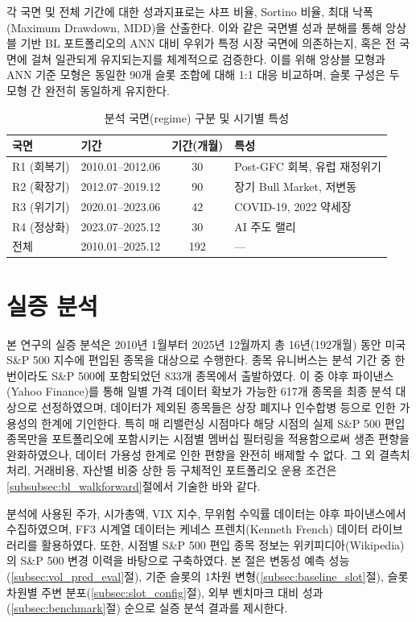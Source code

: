 \documentclass[eng]{kjas3}
\begin{document}
각 국면 및 전체 기간에 대한 성과지표로는 샤프 비율, Sortino 비율, 최대 낙폭(Maximum Drawdown, MDD)을 산출한다. 이와 같은 국면별 성과 분해를 통해 앙상블 기반 BL 포트폴리오의 ANN 대비 우위가 특정 시장 국면에 의존하는지, 혹은 전 국면에 걸쳐 일관되게 유지되는지를 체계적으로 검증한다. 이를 위해 앙상블 모형과 ANN 기준 모형은 동일한 90개 슬롯 조합에 대해 1:1 대응 비교하며, 슬롯 구성은 두 모형 간 완전히 동일하게 유지한다.

\begin{table}[t]
\centering
\caption{분석 국면(regime) 구분 및 시기별 특성}
\label{tab:regimes}
\begin{tabular}{llcl}
\toprule
국면 & 기간 & 기간(개월) & 특성 \\
\midrule
R1 (회복기)  & 2010.01--2012.06 & 30 & Post-GFC 회복, 유럽 재정위기 \\
R2 (확장기)  & 2012.07--2019.12 & 90 & 장기 Bull Market, 저변동 \\
R3 (위기기)  & 2020.01--2023.06 & 42 & COVID-19, 2022 약세장 \\
R4 (정상화)  & 2023.07--2025.12 & 30 & AI 주도 랠리 \\
\midrule
\multicolumn{1}{l}{전체} & 2010.01--2025.12 & 192 & --- \\
\bottomrule
\end{tabular}
\end{table}



\section{실증 분석}\label{sec:result}

본 연구의 실증 분석은 2010년 1월부터 2025년 12월까지 총 16년(192개월) 동안 미국 S\&P 500 지수에 편입된 종목을 대상으로 수행한다. 종목 유니버스는 분석 기간 중 한 번이라도 S\&P 500에 포함되었던 833개 종목에서 출발하였다. 이 중 야후 파이낸스(Yahoo Finance)를 통해 일별 가격 데이터 확보가 가능한 617개 종목을 최종 분석 대상으로 선정하였으며, 데이터가 제외된 종목들은 상장 폐지나 인수합병 등으로 인한 가용성의 한계에 기인한다. 특히 매 리밸런싱 시점마다 해당 시점의 실제 S\&P 500 편입 종목만을 포트폴리오에 포함시키는 시점별 멤버십 필터링을 적용함으로써 생존 편향을 완화하였으나, 데이터 가용성 한계로 인한 편향을 완전히 배제할 수 없다. 그 외 결측치 처리, 거래비용, 자산별 비중 상한 등 구체적인 포트폴리오 운용 조건은 \ref{subsubsec:bl_walkforward}절에서 기술한 바와 같다.

분석에 사용된 주가, 시가총액, VIX 지수, 무위험 수익률 데이터는 야후 파이낸스에서 수집하였으며, FF3 시계열 데이터는 케네스 프렌치(Kenneth French) 데이터 라이브러리를 활용하였다. 또한, 시점별 S\&P 500 편입 종목 정보는 위키피디아(Wikipedia)의 S\&P 500 변경 이력을 바탕으로 구축하였다. 본 절은 변동성 예측 성능(\ref{subsec:vol_pred_eval}절), 기준 슬롯의 1차원 변형(\ref{subsec:baseline_slot}절), 슬롯 차원별 주변 분포(\ref{subsec:slot_config}절), 외부 벤치마크 대비 성과(\ref{subsec:benchmark}절) 순으로 실증 분석 결과를 제시한다.
\end{document}
